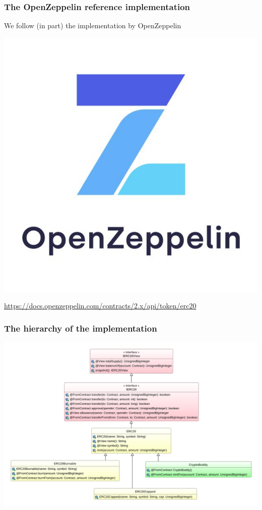 \documentclass[11pt]{beamer}  %
\begin{document}
\begin{frame}\frametitle{The OpenZeppelin reference implementation}

  \begin{greenbox}{We follow (in part) the implementation by OpenZeppelin}
    \begin{center}
      \includegraphics[scale=0.2,clip=false]{pictures/open-zeppelin.jpg}
    \end{center}
    \begin{center}
      \url{https://docs.openzeppelin.com/contracts/2.x/api/token/erc20}
    \end{center}
  \end{greenbox}
  
\end{frame}

\begin{frame}\frametitle{The hierarchy of the implementation}

  \vspace*{-3ex}
  \begin{center}
    \includegraphics[scale=0.4,clip=false]{pictures/erc20-uml.png}
  \end{center}

\end{frame}
\end{document}
